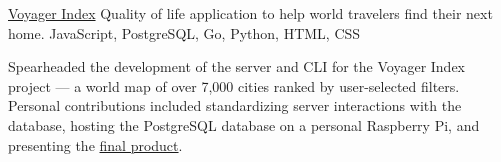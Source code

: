 \showoff
{\textcolor{my-blue}{\href{https://voyager-index.herokuapp.com}{Voyager Index}}}
{Quality of life application to help world travelers find their next home.}
{JavaScript, PostgreSQL, Go, Python, HTML, CSS}
{}

Spearheaded the development of the server and CLI for the Voyager Index project — a world map of over 7,000 cities ranked by user-selected filters. Personal contributions included standardizing server interactions with the database, hosting the PostgreSQL database on a personal Raspberry Pi, and presenting the \textcolor{my-blue}{\href{https://liambeckman.com/pkgs/posters/voyager-index.pdf}{final product}}.

